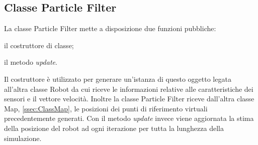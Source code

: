 \subsection{Classe Particle Filter}
\label{ssec:ClassPF}
La classe Particle Filter mette a disposizione due funzioni pubbliche:
\begin{enumerate*}[label={\alph*)},font={\bfseries}]
	\item il costruttore di classe;
	\item il metodo \emph{update}.
\end{enumerate*}
Il costruttore è utilizzato per generare un'istanza di questo oggetto legata
all'altra classe Robot da cui riceve le informazioni relative alle
caratteristiche dei sensori e il vettore velocità.
Inoltre la classe Particle Filter riceve dall'altra classe Map, \ref{ssec:ClassMap},
le posizioni dei punti di riferimento virtuali precedentemente generati.
Con il metodo \emph{update} invece viene aggiornata la stima della posizione del
robot ad ogni iterazione per tutta la lunghezza della simulazione.
